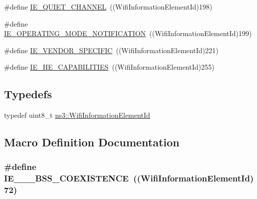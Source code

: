\begin{DoxyCompactItemize}
\#define \hyperlink{wifi-information-element_8h_abbf421abf4f1f2f6038c32526119bb79}{I\+E\+\_\+\+Q\+U\+I\+E\+T\+\_\+\+C\+H\+A\+N\+N\+EL}~((Wifi\+Information\+Element\+Id)198)
\item 
\#define \hyperlink{wifi-information-element_8h_ae2f35dd5da5ffc4924afb41b00d73f81}{I\+E\+\_\+\+O\+P\+E\+R\+A\+T\+I\+N\+G\+\_\+\+M\+O\+D\+E\+\_\+\+N\+O\+T\+I\+F\+I\+C\+A\+T\+I\+ON}~((Wifi\+Information\+Element\+Id)199)
\item 
\#define \hyperlink{wifi-information-element_8h_aca35a2563944816a71385f8cb311447e}{I\+E\+\_\+\+V\+E\+N\+D\+O\+R\+\_\+\+S\+P\+E\+C\+I\+F\+IC}~((Wifi\+Information\+Element\+Id)221)
\item 
\#define \hyperlink{wifi-information-element_8h_a2e4163e0873be453c1c161cc54b8ba88}{I\+E\+\_\+\+H\+E\+\_\+\+C\+A\+P\+A\+B\+I\+L\+I\+T\+I\+ES}~((Wifi\+Information\+Element\+Id)255)
\end{DoxyCompactItemize}
\subsection*{Typedefs}
\begin{DoxyCompactItemize}
\item 
typedef uint8\+\_\+t \hyperlink{namespacens3_aeb185e0c8a60816016bca079f1420478}{ns3\+::\+Wifi\+Information\+Element\+Id}
\end{DoxyCompactItemize}


\subsection{Macro Definition Documentation}
\subsubsection[{\texorpdfstring{I\+E\+\_\+20\+\_\+40\+\_\+\+B\+S\+S\+\_\+\+C\+O\+E\+X\+I\+S\+T\+E\+N\+CE}{IE_20_40_BSS_COEXISTENCE}}]{\setlength{\rightskip}{0pt plus 5cm}\#define I\+E\+\_\+\_\+\_\+\+B\+S\+S\+\_\+\+C\+O\+E\+X\+I\+S\+T\+E\+N\+CE~((Wifi\+Information\+Element\+Id)72)}\hypertarget{wifi-information-element_8h_ace958eaa72bf127aeba15d98ccb818b2}{}\label{wifi-information-element_8h_ace958eaa72bf127aeba15d98ccb818b2}
